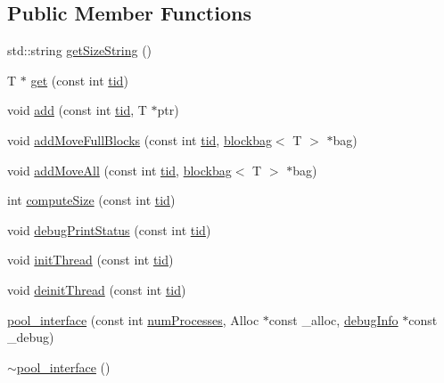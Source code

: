 \subsection*{Public Member Functions}
\begin{DoxyCompactItemize}
\item 
std\+::string \hyperlink{classpool__interface_a9cf0d8a1beeea10001a2386954c35148}{get\+Size\+String} ()
\item 
T $\ast$ \hyperlink{classpool__interface_a813149cd8f557d17871478324073f4e1}{get} (const int \hyperlink{microbench_2main_8cpp_a9ca9869868fe7e7a38a921cc7de4103f}{tid})
\item 
void \hyperlink{classpool__interface_a40c3fd4f6e9fad87c1230b511e630649}{add} (const int \hyperlink{microbench_2main_8cpp_a9ca9869868fe7e7a38a921cc7de4103f}{tid}, T $\ast$ptr)
\item 
void \hyperlink{classpool__interface_afb8890cc6f5228695c06c77ecd70029a}{add\+Move\+Full\+Blocks} (const int \hyperlink{microbench_2main_8cpp_a9ca9869868fe7e7a38a921cc7de4103f}{tid}, \hyperlink{classblockbag}{blockbag}$<$ T $>$ $\ast$bag)
\item 
void \hyperlink{classpool__interface_a58093f6826bc44855b9323e91aa3de7a}{add\+Move\+All} (const int \hyperlink{microbench_2main_8cpp_a9ca9869868fe7e7a38a921cc7de4103f}{tid}, \hyperlink{classblockbag}{blockbag}$<$ T $>$ $\ast$bag)
\item 
int \hyperlink{classpool__interface_aff03189b1d56dbc5debba3df0807bc92}{compute\+Size} (const int \hyperlink{microbench_2main_8cpp_a9ca9869868fe7e7a38a921cc7de4103f}{tid})
\item 
void \hyperlink{classpool__interface_a9671f9620d1bc032065aef4b05c0d51d}{debug\+Print\+Status} (const int \hyperlink{microbench_2main_8cpp_a9ca9869868fe7e7a38a921cc7de4103f}{tid})
\item 
void \hyperlink{classpool__interface_a2415e8d6726ecfc1e13b45e0a81ba573}{init\+Thread} (const int \hyperlink{microbench_2main_8cpp_a9ca9869868fe7e7a38a921cc7de4103f}{tid})
\item 
void \hyperlink{classpool__interface_add48a6c2d94211154702f9543ceff76c}{deinit\+Thread} (const int \hyperlink{microbench_2main_8cpp_a9ca9869868fe7e7a38a921cc7de4103f}{tid})
\item 
\hyperlink{classpool__interface_aacd638d03ecbc3a7e0e3372d88b88629}{pool\+\_\+interface} (const int \hyperlink{testing_8cpp_aa085812188e21ede75351d88b9b2c30d}{num\+Processes}, Alloc $\ast$const \+\_\+alloc, \hyperlink{classdebugInfo}{debug\+Info} $\ast$const \+\_\+debug)
\item 
\hyperlink{classpool__interface_a4d7a8d3165eb068452c71e31dab81a18}{$\sim$pool\+\_\+interface} ()
\end{DoxyCompactItemize}
